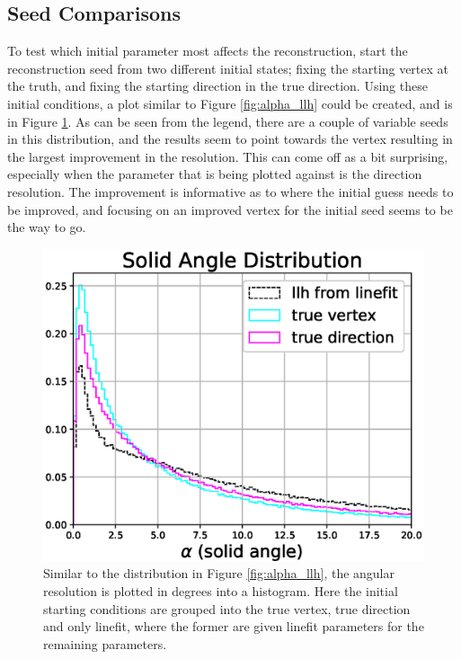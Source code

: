\subsection{Seed Comparisons}

To test which initial parameter most affects the reconstruction, start the reconstruction seed from two different initial states; fixing the starting vertex at the truth, and fixing the starting direction in the true direction. Using these initial conditions, a plot similar to Figure \ref{fig:alpha_llh} could be created, and is in Figure \ref{fig:alpha_llh_test}. As can be seen from the legend, there are a couple of variable seeds in this distribution, and the results seem to point towards the vertex resulting in the largest improvement in the resolution. This can come off as a bit surprising, especially when the parameter that is being plotted against is the direction resolution. The improvement is informative as to where the initial guess needs to be improved, and focusing on an improved vertex for the initial seed seems to be the way to go.

\begin{figure}[H]
  \centering
  \includegraphics[width=12cm]{./Figures/reco_plots/alpha_dist_llh_seedcomparison.eps}
  \caption{Similar to the distribution in Figure \ref{fig:alpha_llh}, the angular resolution is plotted in degrees into a histogram. Here the initial starting conditions are grouped into the true vertex, true direction and only linefit, where the former are given linefit parameters for the remaining parameters.}
  \label{fig:alpha_llh_test}
\end{figure}

